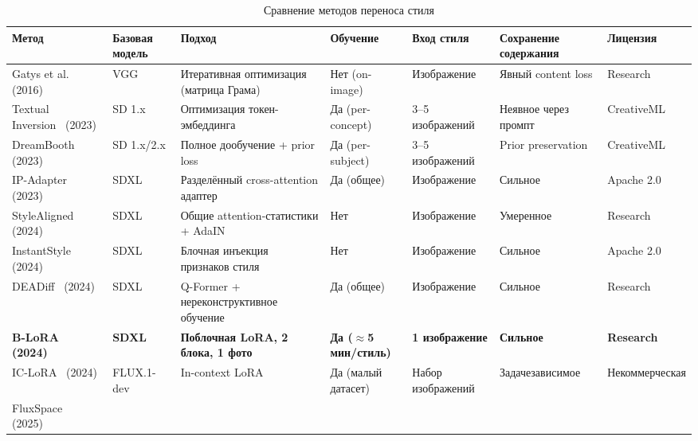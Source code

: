 \begin{landscape}
\begin{table}[p]
\caption{Сравнение методов переноса стиля}
\label{tab:style_transfer_comparison}
\centering
\footnotesize
\begin{tabular}{p{2.8cm} p{2.2cm} p{4.5cm} p{2.5cm} p{2.0cm} p{2.5cm} p{2.0cm}}
\toprule
\textbf{Метод} & \textbf{Базовая модель} & \textbf{Подход} & \textbf{Обучение} & \textbf{Вход стиля} & \textbf{Сохранение содержания} & \textbf{Лицензия} \\
\midrule
Gatys et al.~\cite{gatys2016nst} (2016)
  & VGG
  & Итеративная оптимизация (матрица Грама)
  & Нет (on-image)
  & Изображение
  & Явный content loss
  & Research \\
\addlinespace
Textual Inversion~\cite{gal2023textualinversion} (2023)
  & SD 1.x
  & Оптимизация токен-эмбеддинга
  & Да (per-concept)
  & 3--5 изображений
  & Неявное через промпт
  & CreativeML \\
\addlinespace
DreamBooth~\cite{ruiz2023dreambooth} (2023)
  & SD 1.x/2.x
  & Полное дообучение + prior loss
  & Да (per-subject)
  & 3--5 изображений
  & Prior preservation
  & CreativeML \\
\addlinespace
IP-Adapter~\cite{ye2023ipadapter} (2023)
  & SDXL
  & Разделённый cross-attention адаптер
  & Да (общее)
  & Изображение
  & Сильное
  & Apache 2.0 \\
\addlinespace
StyleAligned~\cite{hertz2024stylealigned} (2024)
  & SDXL
  & Общие attention-статистики + AdaIN
  & Нет
  & Изображение
  & Умеренное
  & Research \\
\addlinespace
InstantStyle~\cite{wang2024instantstyle} (2024)
  & SDXL
  & Блочная инъекция признаков стиля
  & Нет
  & Изображение
  & Сильное
  & Apache 2.0 \\
\addlinespace
DEADiff~\cite{qi2024deadiff} (2024)
  & SDXL
  & Q-Former + нереконструктивное обучение
  & Да (общее)
  & Изображение
  & Сильное
  & Research \\
\addlinespace
\textbf{B-LoRA}~\cite{frenkel2024blora} \textbf{(2024)}
  & \textbf{SDXL}
  & \textbf{Поблочная LoRA, 2 блока, 1 фото}
  & \textbf{Да (${\approx}$5 мин/стиль)}
  & \textbf{1 изображение}
  & \textbf{Сильное}
  & \textbf{Research} \\
\addlinespace
IC-LoRA~\cite{huang2024iclora} (2024)
  & FLUX.1-dev
  & In-context LoRA
  & Да (малый датасет)
  & Набор изображений
  & Задачезависимое
  & Некоммерческая \\
\addlinespace
FluxSpace~\cite{dalva2024fluxspace} (2025)

\end{tabular}
\end{table}
\end{landscape}
